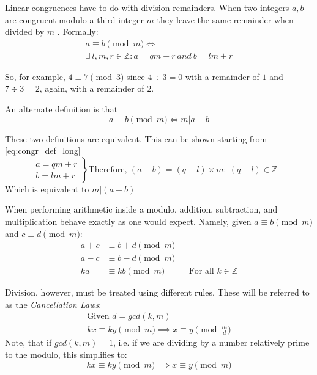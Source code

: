 \documentclass[12pt, titlepage]{article}
\begin{document}
    Linear congruences have to do with division remainders. When two integers $a, b$ are
    congruent modulo a third integer $m$ they leave the same remainder when divided by $m$
    \autocite[278]{haese_ib_options}. Formally:
    \begin{equation}\label{eq:congr_def_long}
        \begin{gathered}
            a \equiv b \pmod{m} \iff \\
            \exists\ l,m,r \in \mathbb{Z}: a = qm + r\ and\ b = lm + r
        \end{gathered}
    \end{equation}

    So, for example, $4 \equiv 7 \pmod{3}$ since $4 \div 3 = 0$ with a remainder of $1$ and
    $7 \div 3 = 2$, again, with a remainder of $2$.

    An alternate definition is that
    \begin{equation*}
        a \equiv b \pmod{m} \iff m | a-b
    \end{equation*}

    These two definitions are equivalent. This can be shown starting from
    \eqref{eq:congr_def_long}
%
    \begin{equation*}
        \left. 
            \begin{aligned}
                a = qm + r\\ 
                b = lm + r
            \end{aligned}
        \right\}
        \text{Therefore, } (a - b) = (q-l)\times m :\: (q-l) \in \mathbb{Z}\quad
    \end{equation*}
    Which is equivalent to $m | (a-b)$

    When performing arithmetic inside a modulo, addition, subtraction, and multiplication
    behave exactly as one would expect. Namely, given
    $a\equiv b\pmod{m}$ and $c\equiv d\pmod{m}$:
    \begin{align*}
        a + c &\equiv b + d \pmod{m}\\
        a - c &\equiv b - d \pmod{m}\\
        ka 	  &\equiv kb \pmod{m} &&\text{For all } k \in \mathbb{Z}
    \end{align*}

    Division, however, must be treated using different rules. These will be referred to as
    the \emph{Cancellation Laws}\autocite[280]{haese_ib_options}:
    \begin{gather*}
        \text{Given } d = gcd(k, m)\\
        kx \equiv ky \pmod{m} \implies x \equiv y \pmod{\frac{m}{d}}
    \end{gather*}
    Note, that if $gcd(k, m) = 1$, i.e. if we are dividing by a number relatively prime to
    the modulo, this simplifies to:
    \begin{equation*}
        kx \equiv ky \pmod{m} \implies x \equiv y \pmod{m}
    \end{equation*}
\end{document}
